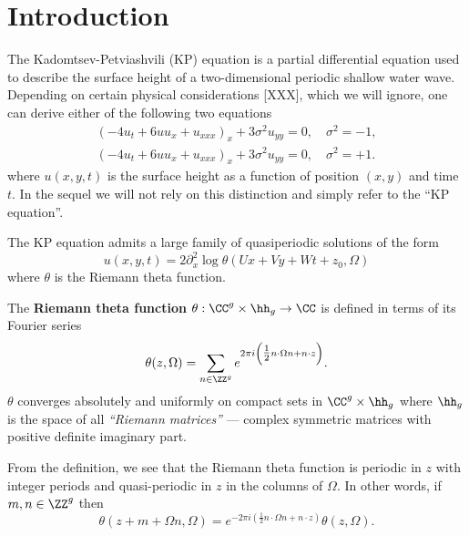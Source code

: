 \section{Introduction}

The Kadomtsev-Petviashvili (KP) equation is a partial differential
equation used to describe the surface height of a two-dimensional
periodic shallow water wave. Depending on certain physical
considerations [XXX], which we will ignore, one can derive either of the
following two equations
\begin{align}
  \left(-4u_t + 6uu_x + u_{xxx}\right)_x + 3\sigma^2 u_{yy} = 0, \quad
  \sigma^2 = -1, \label{eqn: KP1} \\
  \left(-4u_t + 6uu_x + u_{xxx}\right)_x + 3\sigma^2 u_{yy} = 0, \quad
  \sigma^2 = +1. \label{eqn: KP2}
\end{align}
where $u(x,y,t)$ is the surface height as a function of position $(x,y)$
and time $t$. In the sequel we will not rely on this distinction and
simply refer to the ``KP equation''.


The KP equation admits a large family of quasiperiodic solutions of the
form
\begin{equation} \label{eqn: kpsol}
  u(x,y,t) = 2 \partial_x^2 \log \theta(Ux+Vy+Wt+z_0, \Omega)
\end{equation}
where $\theta$ is the Riemann theta function.

\begin{definition} \label{def: riemanntheta}
  The {\bf Riemann theta function} $\theta: \CC^g \times \hh_g \to \CC$
  is defined in terms of its Fourier series
  \begin{equation} \label{eqn: riemanntheta}
    \theta(z,\Omega) = \sum_{n \in \ZZ^g}
    e^{2 \pi i \left( \tfrac{1}{2} n \cdot \Omega n + n \cdot z \right)}.
  \end{equation}
  $\theta$ converges absolutely and uniformly on compact sets in $\CC^g
  \times \hh_g$ where $\hh_g$ is the space of all {\it ``Riemann
    matrices''} --- complex symmetric matrices with positive definite
  imaginary part.
\end{definition}

From the definition, we see that the Riemann theta function is periodic
in $z$ with integer periods and quasi-periodic in $z$ in the columns of
$\Omega$. In other words, if $m,n \in \ZZ^g$ then
\begin{equation} \label{eq: quasiperiodicity}
    \theta(z + m + \Omega n, \Omega) =
    e^{-2 \pi i \left( \tfrac{1}{2} n \cdot \Omega n + n \cdot z \right) }
    \theta(z, \Omega).
\end{equation}

